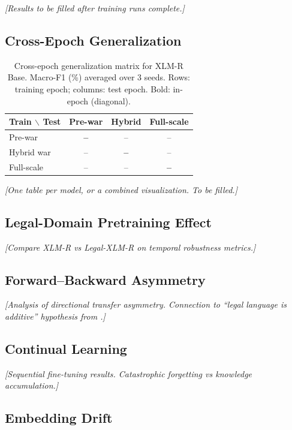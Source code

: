 \documentclass[11pt]{article}
\begin{document}
\textit{[Results to be filled after training runs complete.]}

\subsection{Cross-Epoch Generalization}

\begin{table}[t]
\centering
\small
\caption{Cross-epoch generalization matrix for XLM-R Base. Macro-F1 (\%) averaged over 3 seeds. Rows: training epoch; columns: test epoch. Bold: in-epoch (diagonal).}
\label{tab:cross_epoch_base}
\begin{tabular}{lccc}
\toprule
\textbf{Train $\backslash$ Test} & \textbf{Pre-war} & \textbf{Hybrid} & \textbf{Full-scale} \\
\midrule
Pre-war    & \textbf{--} & -- & -- \\
Hybrid war & -- & \textbf{--} & -- \\
Full-scale & -- & -- & \textbf{--} \\
\bottomrule
\end{tabular}
\end{table}

\textit{[One table per model, or a combined visualization. To be filled.]}

\subsection{Legal-Domain Pretraining Effect}

\textit{[Compare XLM-R vs Legal-XLM-R on temporal robustness metrics.]}

\subsection{Forward--Backward Asymmetry}

\textit{[Analysis of directional transfer asymmetry. Connection to ``legal language is additive'' hypothesis from \citet{ovcharov2025tokenizer}.]}

\subsection{Continual Learning}

\textit{[Sequential fine-tuning results. Catastrophic forgetting vs knowledge accumulation.]}

\subsection{Embedding Drift}
\end{document}
